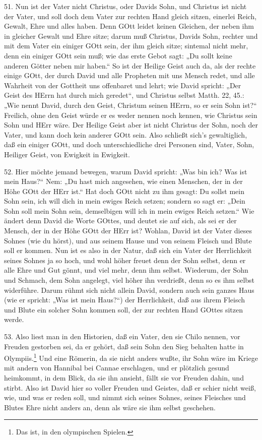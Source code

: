 51. Nun ist der Vater nicht Christus, oder Davids Sohn, und Christus ist nicht der Vater, und soll doch dem Vater zur rechten Hand gleich sitzen, einerlei Reich, Gewalt, Ehre und alles haben. Denn GOtt leidet keinen Gleichen, der neben ihm in gleicher Gewalt und Ehre sitze; darum muß Christus, Davids Sohn, rechter und mit dem Vater ein einiger GOtt sein, der ihm gleich sitze; sintemal nicht mehr, denn ein einiger GOtt sein muß; wie das erste Gebot sagt: „Du sollt keine anderen Götter neben mir haben.“ So ist der Heilige Geist auch da, als der rechte einige GOtt, der durch David und alle Propheten mit uns Mensch redet, und alle Wahrheit von der Gottheit uns offenbaret und lehrt; wie David spricht: „Der Geist des HErrn hat durch mich geredet“, und Christus selbst Matth. 22, 45.: „Wie nennt David, durch den Geist, Christum seinen HErrn, so er sein Sohn ist?“ Freilich, ohne den Geist würde er
es weder nennen noch kennen, wie Christus sein Sohn und HErr wäre. Der Heilige Geist aber ist nicht Christus der Sohn, noch der Vater, und kann doch kein anderer GOtt sein. Also schließt sich’s gewaltiglich, daß ein einiger GOtt, und doch unterschiedliche drei Personen sind, Vater, Sohn, Heiliger Geist, von Ewigkeit in Ewigkeit.

52. Hier möchte jemand bewegen, warum David spricht: „Was bin ich? Was ist mein Haus?“ Nem: „Du hast mich angesehen, wie einen Menschen, der in der Höhe GOtt der HErr ist.“ Hat doch GOtt nicht zu ihm gesagt: Du sollst mein Sohn sein, ich will dich in mein ewiges Reich setzen; sondern so sagt er: „Dein Sohn soll mein Sohn sein, demselbigen will ich in mein ewiges Reich setzen.“ Wie ändert denn David die Worte GOttes, und deutet sie auf sich, als sei er der Mensch, der in der Höhe GOtt der HErr ist? Wohlan, David ist der Vater dieses Sohnes (wie du hörst), und aus seinem Hause und von seinem Fleisch und Blute soll er kommen. Nun ist es also in der Natur, daß sich ein Vater der Herrlichkeit seines Sohnes ja so hoch, und wohl höher freuet denn der Sohn selbst, denn er alle Ehre und Gut gönnt, und viel mehr, denn ihm selbst. Wiederum, der Sohn und Schmach, dem Sohn angelegt, viel höher ihn verdrießt, denn so es ihm selbst widerführe. Darum rühmt sich nicht allein David, sondern auch sein ganzes Haus (wie er spricht: „Was ist mein Haus?“) der Herrlichkeit, daß aus ihrem Fleisch und Blute ein solcher Sohn kommen soll, der zur rechten Hand GOttes sitzen werde.

53. Also liest man in den Historien, daß ein Vater, den sie Chilo nennen, vor Freuden gestorben sei, da er gehört, daß sein Sohn den Sieg behalten hatte in Olympiis.\footnote{Das ist, in den olympischen Spielen.} Und eine Römerin, da sie nicht anders wußte, ihr Sohn wäre im Kriege mit andern von Hannibal bei Cannae erschlagen, und er plötzlich gesund heimkommt, in dem Blick, da sie ihn ansieht, fällt sie vor Freuden dahin, und stirbt. Also ist David hier so voller Freuden und Geistes, daß er schier nicht weiß, wie, und was er reden soll, und nimmt sich seines Sohnes, seines Fleisches und Blutes Ehre nicht anders an, denn als wäre sie ihm selbst geschehen.

